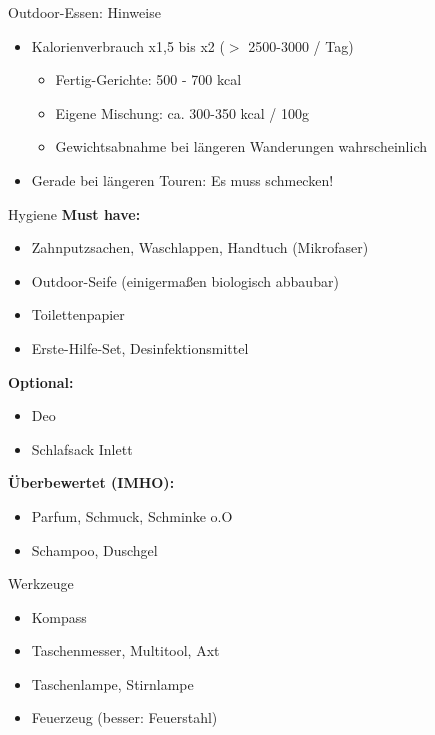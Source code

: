 \documentclass[aspectratio=169]{beamer}
\begin{document}
			\begin{frame}{Outdoor-Essen: Hinweise}
				\begin{itemize}
					\item Kalorienverbrauch x1,5 bis x2 ($>$ 2500-3000 / Tag)
					\begin{itemize}
						\item Fertig-Gerichte: 500 - 700 kcal
						\item Eigene Mischung: ca. 300-350 kcal / 100g
						\item Gewichtsabnahme bei längeren Wanderungen wahrscheinlich
					\end{itemize}
					\item Gerade bei längeren Touren: Es muss schmecken!
				\end{itemize}
			\end{frame}
			
			\begin{frame}{Hygiene}
				\textbf{Must have:}
				\begin{itemize}
					\item Zahnputzsachen, Waschlappen, Handtuch (Mikrofaser)
					\item Outdoor-Seife (einigermaßen biologisch abbaubar)
					\item Toilettenpapier
					\item Erste-Hilfe-Set, Desinfektionsmittel
				\end{itemize}\pause
				\textbf{Optional:}
				\begin{itemize}
					\item Deo
					\item Schlafsack Inlett
				\end{itemize}\pause
				\textbf{Überbewertet (IMHO):}
				\begin{itemize}
					\item Parfum, Schmuck, Schminke o.O
					\item Schampoo, Duschgel
				\end{itemize}
			\end{frame}
			
			\begin{frame}{Werkzeuge}
				\begin{itemize}
					\item Kompass
					\item Taschenmesser, Multitool, Axt
					\item Taschenlampe, Stirnlampe
					\item Feuerzeug (besser: Feuerstahl)
				\end{itemize}
			\end{frame}
			
\end{document}
